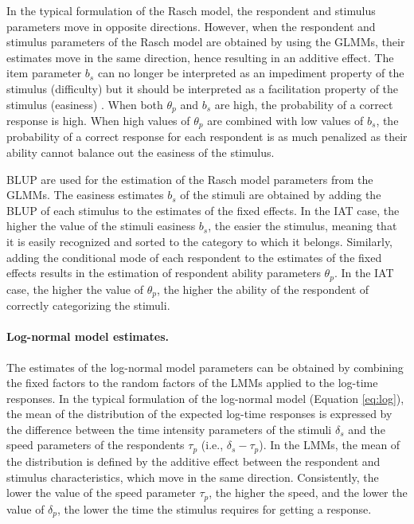 \documentclass[12pt]{book}
\begin{document}
In the typical formulation of the Rasch model,  the respondent and stimulus parameters move in opposite directions. 
However, when the respondent and stimulus parameters of the Rasch model are obtained by using the GLMMs, their estimates move in the same direction, hence resulting in an additive effect.
The item parameter $b_s$ can no longer be interpreted as an impediment property  of the stimulus (difficulty) but it should be interpreted as a facilitation property of the stimulus (easiness) \cite{DeBoeck2011, Doran2007}. 
When both $\theta_p$ and $b_s$ are high, the probability of a correct response is high. 
When high values of $\theta_p$ are combined with low values of $b_s$, the probability of a correct response for each respondent is as much penalized as their ability cannot balance out the easiness of the stimulus. 

BLUP are used for the estimation of the Rasch model parameters from the GLMMs. 
The easiness estimates $b_s$ of the stimuli are obtained by adding the BLUP of each stimulus to the estimates of the fixed effects. 
In the IAT case, the higher the value of the stimuli easiness $b_s$, the easier the stimulus, meaning that it is easily recognized and sorted to the category to which it belongs.  
Similarly, adding the conditional mode of each respondent to the estimates of the fixed effects results in the estimation of  respondent ability parameters $\theta_p$. 
In the IAT case, the higher the value of $\theta_p$, the higher the ability of the respondent of correctly categorizing the stimuli. 


\paragraph{Log-normal model estimates.}

%
The estimates of the log-normal model parameters can be obtained by combining the fixed factors to the random factors of the LMMs applied to the log-time responses.  
In the typical formulation of the log-normal model (Equation \ref{eq:log}), the mean of the distribution of the expected log-time responses is expressed by the difference between the time intensity parameters of the stimuli $\delta_s$ and the speed parameters of the respondents $\tau_p$ (i.e., $\delta_s - \tau_{p}$). 
In the LMMs, the mean of the distribution is defined by the additive effect between the respondent and stimulus characteristics, which move in the same direction. Consistently, the lower the value of the speed parameter $\tau_p$, the  higher the speed, and the lower the value of $\delta_p$, the lower the time the stimulus requires for getting a response. 
\end{document}
